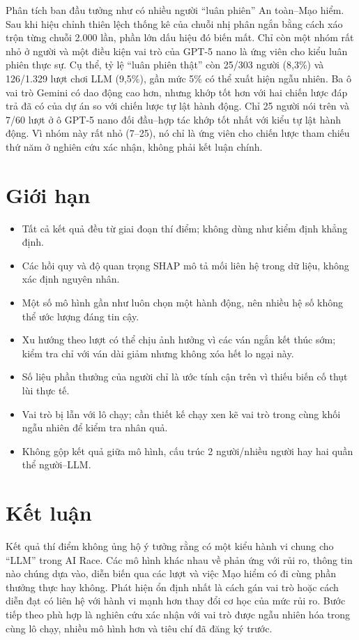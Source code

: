 \documentclass[11pt]{article}
\begin{document}
Phân tích ban đầu tưởng như có nhiều người ``luân phiên'' An toàn--Mạo hiểm.
Sau khi hiệu chỉnh thiên lệch thống kê của chuỗi nhị phân ngắn bằng cách xáo
trộn từng chuỗi 2.000 lần, phần lớn dấu hiệu đó biến mất. Chỉ còn một nhóm rất
nhỏ ở người và một điều kiện vai trò của GPT-5 nano là ứng viên cho kiểu luân
phiên thực sự. Cụ thể, tỷ lệ ``luân phiên thật'' còn 25/303 người (8,3\%) và
126/1.329 lượt chơi LLM (9,5\%), gần mức 5\% có thể xuất hiện ngẫu nhiên. Ba ô
vai trò Gemini có dao động cao hơn, nhưng khớp tốt hơn với hai chiến lược đáp
trả đã có của dự án so với chiến lược tự lật hành động. Chỉ 25 người nói trên và
7/60 lượt ở ô GPT-5 nano đối đầu--hợp tác khớp tốt nhất với kiểu tự lật hành
động. Vì nhóm này rất nhỏ (7--25), nó chỉ là ứng viên cho chiến lược tham chiếu
thứ năm ở nghiên cứu xác nhận, không phải kết luận chính.

\section{Giới hạn}
\begin{itemize}[leftmargin=*]
\item Tất cả kết quả đều từ giai đoạn thí điểm; không dùng như kiểm định khẳng định.
\item Các hồi quy và độ quan trọng SHAP mô tả mối liên hệ trong dữ liệu, không xác định nguyên nhân.
\item Một số mô hình gần như luôn chọn một hành động, nên nhiều hệ số không thể ước lượng đáng tin cậy.
\item Xu hướng theo lượt có thể chịu ảnh hưởng vì các ván ngắn kết thúc sớm; kiểm tra chỉ với ván dài giảm nhưng không xóa hết lo ngại này.
\item Số liệu phần thưởng của người chỉ là ước tính cận trên vì thiếu biến cố thụt lùi thực tế.
\item Vai trò bị lẫn với lô chạy; cần thiết kế chạy xen kẽ vai trò trong cùng khối ngẫu nhiên để kiểm tra nhân quả.
\item Không gộp kết quả giữa mô hình, cấu trúc 2 người/nhiều người hay hai quần thể người--LLM.
\end{itemize}

\section{Kết luận}
Kết quả thí điểm không ủng hộ ý tưởng rằng có một kiểu hành vi chung cho ``LLM''
trong AI Race. Các mô hình khác nhau về phản ứng với rủi ro, thông tin nào chúng
dựa vào, diễn biến qua các lượt và việc Mạo hiểm có đi cùng phần thưởng thực hay
không. Phát hiện ổn định nhất là cách gán vai trò hoặc cách diễn đạt có liên hệ
với hành vi mạnh hơn thay đổi cơ học của mức rủi ro. Bước tiếp theo phù hợp là
nghiên cứu xác nhận với vai trò được ngẫu nhiên hóa trong cùng lô chạy, nhiều mô
hình hơn và tiêu chí đã đăng ký trước.
\end{document}
